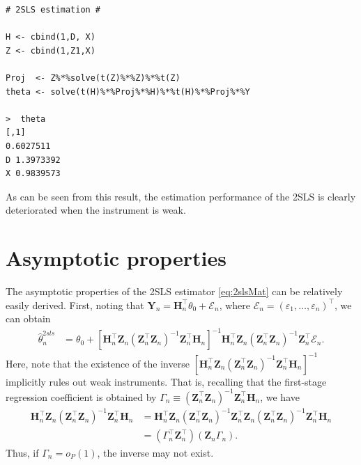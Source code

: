 \documentclass[10.5pt, A4paper, openany, uplatex]{book}
\newcommand{\mbf}{\mathbf}
\newcommand{\mcl}{\mathcal}
\newcommand{\eps}{\varepsilon}
\renewcommand{\hat}{\widehat}
\numberwithin{equation}{section}
\begin{document}
\begin{lstlisting}[basicstyle=\ttfamily\footnotesize, frame=single]
# 2SLS estimation #

H <- cbind(1,D, X)
Z <- cbind(1,Z1,X)

Proj  <- Z%*%solve(t(Z)%*%Z)%*%t(Z)
theta <- solve(t(H)%*%Proj%*%H)%*%t(H)%*%Proj%*%Y

>  theta
[,1]
0.6027511
D 1.3973392
X 0.9839573
\end{lstlisting}
As can be seen from this result, the estimation performance of the 2SLS is clearly deteriorated when the instrument is weak.

\section{Asymptotic properties}\label{sec:2slsAsymptotics}

The asymptotic properties of the 2SLS estimator \eqref{eq:2slsMat} can be relatively easily derived.
First, noting that $\mbf{Y}_n = \mbf{H}_n^\top\theta_0 + \mcl{E}_n$, where $\mcl{E}_n = (\eps_1, \ldots , \eps_n)^\top$, we can obtain
\begin{align*}
	\hat\theta_n^{2sls} 
	& = \theta_0 + \left[\mbf{H}_n^\top \mbf{Z}_n(\mbf{Z}_n^\top \mbf{Z}_n)^{-1}\mbf{Z}_n^\top \mbf{H}_n  \right]^{-1}\mbf{H}_n^\top \mbf{Z}_n(\mbf{Z}_n^\top \mbf{Z}_n)^{-1}\mbf{Z}_n^\top\mcl{E}_n.
\end{align*}
Here, note that the existence of the inverse $\left[\mbf{H}_n^\top \mbf{Z}_n(\mbf{Z}_n^\top \mbf{Z}_n)^{-1}\mbf{Z}_n^\top \mbf{H}_n  \right]^{-1}$ implicitly rules out weak instruments.
That is, recalling that the first-stage regression coefficient is obtained by $\Gamma_n \equiv (\mbf{Z}_n^\top \mbf{Z}_n)^{-1}\mbf{Z}_n^\top \mbf{H}_n$, we have
\begin{align*}
	\mbf{H}_n^\top \mbf{Z}_n(\mbf{Z}_n^\top \mbf{Z}_n)^{-1}\mbf{Z}_n^\top \mbf{H}_n
	& = \mbf{H}_n^\top \mbf{Z}_n(\mbf{Z}_n^\top \mbf{Z}_n)^{-1}\mbf{Z}_n^\top \mbf{Z}_n (\mbf{Z}_n^\top \mbf{Z}_n)^{-1} \mbf{Z}_n^\top \mbf{H}_n \\
	& = (\Gamma_n^\top \mbf{Z}_n^\top) (\mbf{Z}_n \Gamma_n).
\end{align*}
Thus, if $\Gamma_n = o_P(1)$, the inverse may not exist.
\end{document}
